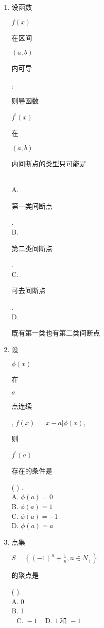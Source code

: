 \documentclass[10pt]{article}
\begin{document}
\begin{enumerate}
  \item \begin{CJK}{UTF8}{mj}设函数\end{CJK} $f(x)$ \begin{CJK}{UTF8}{mj}在区间\end{CJK} $(a, b)$ \begin{CJK}{UTF8}{mj}内可导\end{CJK}, \begin{CJK}{UTF8}{mj}则导函数\end{CJK} $f^{\prime}(x)$ \begin{CJK}{UTF8}{mj}在\end{CJK} $(a, b)$ \begin{CJK}{UTF8}{mj}内间断点的类型只可能是\end{CJK}\\
A. \begin{CJK}{UTF8}{mj}第一类间断点\end{CJK}.\\
B. \begin{CJK}{UTF8}{mj}第二类间断点\end{CJK}.\\
C. \begin{CJK}{UTF8}{mj}可去间断点\end{CJK}.\\
D. \begin{CJK}{UTF8}{mj}既有第一类也有第二类间断点\end{CJK}

  \item \begin{CJK}{UTF8}{mj}设\end{CJK} $\phi(x)$ \begin{CJK}{UTF8}{mj}在\end{CJK} $a$ \begin{CJK}{UTF8}{mj}点连续\end{CJK}, $f(x)=|x-a| \phi(x)$, \begin{CJK}{UTF8}{mj}则\end{CJK} $f^{\prime}(a)$ \begin{CJK}{UTF8}{mj}存在的条件是\end{CJK} ( ) .\\
A. $\phi(a)=0$\\
B. $\phi(a)=1$\\
C. $\phi(a)=-1$\\
D. $\phi(a)=a$

  \item \begin{CJK}{UTF8}{mj}点集\end{CJK} $S=\left\{(-1)^{n}+\frac{1}{n}, n \in N_{+}\right\}$\begin{CJK}{UTF8}{mj}的聚点是\end{CJK} ( ).\\
A. 0\\
B. 1\\
$\begin{array}{ll}\text { C. }-1 & \text { D. } 1 \text { 和 }-1\end{array}$


\end{enumerate}
\end{document}
